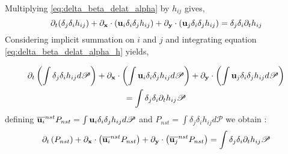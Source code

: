 Multiplying \ref{eq:delta_beta_delat_alpha} by $h_{ij}$ gives, 
\begin{equation}
    \partial_t (\delta_j\delta_i h_{ij}) + \partial_\textbf{x} \cdot (\textbf{u}_i \delta_i\delta_j h_{ij}) + \partial_\textbf{y} \cdot (\textbf{u}_j \delta_i\delta_j h_{ij}) = \delta_j\delta_i\partial_t h_{ij}
    \label{eq:delta_beta_delat_alpha_h}
\end{equation}
Considering implicit summation on $i$ and $j$ and integrating equation \ref{eq:delta_beta_delat_alpha_h}  yields, 

\begin{multline}
    \partial_t \left(\int \delta_j\delta_i h_{ij} d\mathscr{P} \right) 
    + \partial_\textbf{x} \cdot \left(\int\textbf{u}_i \delta_i\delta_j h_{ij} d\mathscr{P} \right) 
    + \partial_\textbf{y} \cdot \left( \int \textbf{u}_j \delta_i\delta_j h_{ij} d\mathscr{P} \right) 
    \\=\int \delta_j\delta_i\partial_t h_{ij} \mathscr{P}
\end{multline}
defining $\overline{\textbf{u}_i}^{nst} P_{nst}= \int\textbf{u}_i \delta_i\delta_j h_{ij} d\mathscr{P} $ and $P_{nst} = \int \delta_j\delta_i h_{ij} d\mathscr{P} $ we obtain :
\begin{equation}
    \partial_t \left(P_{nst} \right) 
    + \partial_\textbf{x} \cdot \left(\overline{\textbf{u}_i}^{nst} P_{nst}\right) 
    + \partial_\textbf{y} \cdot \left( \overline{\textbf{u}_j}^{nst} P_{nst} \right) 
    =\int \delta_j\delta_i\partial_t h_{ij} \mathscr{P}
\end{equation}

